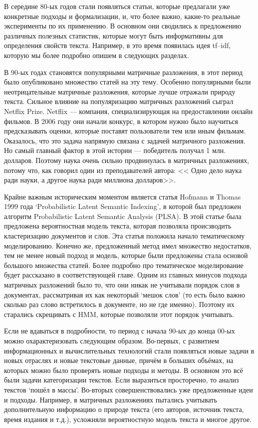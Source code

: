 \documentclass[a4paper,14pt]{extarticle}
\begin{document}
В середине 80-ых годов стали появляться статьи, которые предлагали уже конкретные подходы и формализации, и, что более важно, какие-то реальные эксперименты по их применению. В основном они сводились к предложению различных полезных статистик, которые могут быть информативны для определения свойств текста. Например, в это время появилась идея tf–idf, которую мы более подробно опишем в следующих разделах.

В 90-ых годах становятся популярными матричные разложения, в этот период было опубликовано множество статей на эту тему. Особенно популярными были неотрицательные матричные разложения, которые лучше отражали природу текста. Сильное влияние на популяризацию матричных разложений сыграл Netflix Prize. Netflix --- компания, специализирующая на предоставлении онлайн фильмов. В 2006 году они начали конкурс, в котором нужно было научиться предсказывать оценки, которые поставят пользователи тем или иным фильмам. Оказалось, что это задача напрямую связана с задачей матричного разложения. Но самый главный фактор в этой истории --- победитель получал 1 млн. долларов. Поэтому наука очень сильно продвинулась в матричных разложениях, потому что, как говорил один из преподавателей автора: << Одно дело наука ради науки, а другое наука ради миллиона долларов>>.

Крайне важным историческим моментом является статья Hofmann и Thomas 1999 года `Probabilistic Latent Semantic Indexing', в которой был предложен алгоритм Probabilistic Latent Semantic Analysis (PLSA). В этой статье была предложена вероятностная модель текста, которая позволяла происзводить кластеризацию документов и слов. Эта статья положила начало тематическому моделированию. Конечно же, предложенный метод имел множество недостатков, тем не менее новый подход и модель, которые были предложены стала основой большого множества статей. Более подробно про тематическое моделирование будет рассказано в соответствующей главе. Одним из главных минусов подхода матричных разложений было то, что они никак не учитывали порядок слов в документах, рассматривая их как некоторый `мешок слов' (то есть было важно сколько раз слово встретилось в документе, но не где именно). Поэтому их старались скрещивать с HMM, которые позволяли этот порядок учитывать.

Если не вдаваться в подробности, то период с начала 90-ых до конца 00-ых можно охарактеризовать следующим образом. Во-первых, с развитием информационных и вычислительных технологий стали появляться новые задачи в новых отраслях и новые текстовые данные, причём в больших объёмах, на которых можно было проверять новые подходы и методы. В основном это всё были задачи категоризации текстов. Если выразиться просторечно, то анализ текстов `пошёл в массы'. Во-вторых совершенствовались уже предложенные идеи и подходы. Например, в матричных разложениях пытались учитывать дополнительную информацию о природе текста (его авторов, источник текста, время издания и т.д.), усложняли вероятностную модель текста и многое другое.
\end{document}
